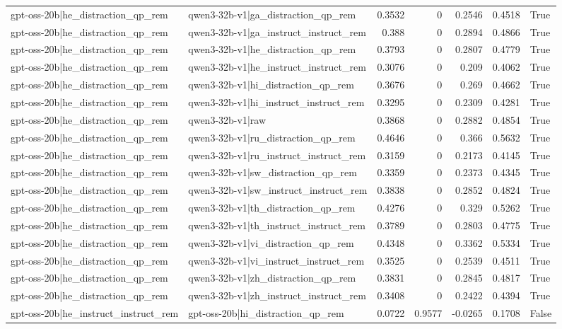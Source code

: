 \begin{table}
\begin{tabular}{l l r r r r l}
gpt-oss-20b|he_distraction_qp_rem & qwen3-32b-v1|ga_distraction_qp_rem & 0.3532 & 0 & 0.2546 & 0.4518 & True \\
gpt-oss-20b|he_distraction_qp_rem & qwen3-32b-v1|ga_instruct_instruct_rem & 0.388 & 0 & 0.2894 & 0.4866 & True \\
gpt-oss-20b|he_distraction_qp_rem & qwen3-32b-v1|he_distraction_qp_rem & 0.3793 & 0 & 0.2807 & 0.4779 & True \\
gpt-oss-20b|he_distraction_qp_rem & qwen3-32b-v1|he_instruct_instruct_rem & 0.3076 & 0 & 0.209 & 0.4062 & True \\
gpt-oss-20b|he_distraction_qp_rem & qwen3-32b-v1|hi_distraction_qp_rem & 0.3676 & 0 & 0.269 & 0.4662 & True \\
gpt-oss-20b|he_distraction_qp_rem & qwen3-32b-v1|hi_instruct_instruct_rem & 0.3295 & 0 & 0.2309 & 0.4281 & True \\
gpt-oss-20b|he_distraction_qp_rem & qwen3-32b-v1|raw & 0.3868 & 0 & 0.2882 & 0.4854 & True \\
gpt-oss-20b|he_distraction_qp_rem & qwen3-32b-v1|ru_distraction_qp_rem & 0.4646 & 0 & 0.366 & 0.5632 & True \\
gpt-oss-20b|he_distraction_qp_rem & qwen3-32b-v1|ru_instruct_instruct_rem & 0.3159 & 0 & 0.2173 & 0.4145 & True \\
gpt-oss-20b|he_distraction_qp_rem & qwen3-32b-v1|sw_distraction_qp_rem & 0.3359 & 0 & 0.2373 & 0.4345 & True \\
gpt-oss-20b|he_distraction_qp_rem & qwen3-32b-v1|sw_instruct_instruct_rem & 0.3838 & 0 & 0.2852 & 0.4824 & True \\
gpt-oss-20b|he_distraction_qp_rem & qwen3-32b-v1|th_distraction_qp_rem & 0.4276 & 0 & 0.329 & 0.5262 & True \\
gpt-oss-20b|he_distraction_qp_rem & qwen3-32b-v1|th_instruct_instruct_rem & 0.3789 & 0 & 0.2803 & 0.4775 & True \\
gpt-oss-20b|he_distraction_qp_rem & qwen3-32b-v1|vi_distraction_qp_rem & 0.4348 & 0 & 0.3362 & 0.5334 & True \\
gpt-oss-20b|he_distraction_qp_rem & qwen3-32b-v1|vi_instruct_instruct_rem & 0.3525 & 0 & 0.2539 & 0.4511 & True \\
gpt-oss-20b|he_distraction_qp_rem & qwen3-32b-v1|zh_distraction_qp_rem & 0.3831 & 0 & 0.2845 & 0.4817 & True \\
gpt-oss-20b|he_distraction_qp_rem & qwen3-32b-v1|zh_instruct_instruct_rem & 0.3408 & 0 & 0.2422 & 0.4394 & True \\
gpt-oss-20b|he_instruct_instruct_rem & gpt-oss-20b|hi_distraction_qp_rem & 0.0722 & 0.9577 & -0.0265 & 0.1708 & False \\

\end{tabular}
\end{table}
